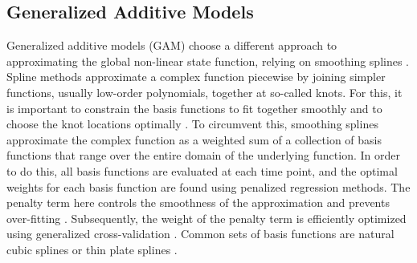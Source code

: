 
\subsection{Generalized Additive Models}

Generalized additive models (GAM) choose a different approach to approximating
the global
non-linear state function, relying on smoothing splines
\parencite{wood_generalized_2006, wood_inference_2020,
    hastie_generalized_1999}.
Spline methods approximate a complex function piecewise by joining
simpler functions, usually low-order polynomials, together at so-called knots.
For this,
it is important to constrain the basis functions to fit together smoothly and
to choose
the knot locations optimally \parencite{tsay_nonlinear_2019}. To circumvent
this, smoothing
splines approximate the complex function as a weighted sum of a collection of
basis functions
that range over the entire domain of the underlying function. In order to do
this, all basis functions are evaluated at each
time point, and the optimal weights for each basis function are found using
penalized regression
methods. The penalty term here controls the smoothness of the approximation and
prevents
over-fitting \parencite{gu_smoothing_2013, wahba_spline_1980}. Subsequently,
the weight of the penalty term
is efficiently optimized using generalized cross-validation
\parencite{wood_generalized_2006,
    golub_generalized_1997}. Common sets of basis functions are natural cubic
splines
\parencite{tsay_nonlinear_2019} or thin plate splines
\parencite{wood_thin_2003}.

